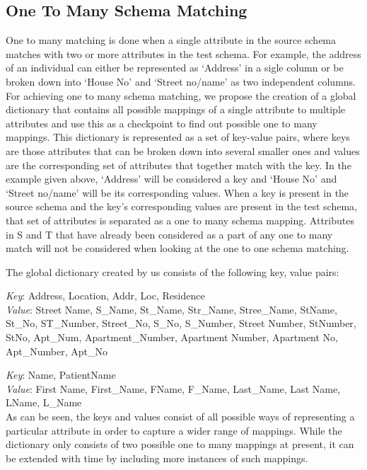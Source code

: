 \documentclass[conference]{IEEEtran}
\begin{document}
\subsection{One To Many Schema Matching}
One to many matching is done when a single attribute in the source schema matches with two or more attributes in the test schema. For example, the address of an individual can either be represented as `Address' in a sigle column or be broken down into `House No' and `Street no/name' as two independent columns. For achieving one to many schema matching, we propose the creation of a global dictionary that contains all possible mappings of a single attribute to multiple attributes and use this as a checkpoint to find out possible one to many mappings. This dictionary is represented as a set of key-value pairs, where keys are those attributes that can be broken down into several smaller ones and values are the corresponding set of attributes that together match with the key. In the example given above, `Address' will be considered a key and `House No' and `Street no/name' will be its corresponding values. When a key is present in the source schema and the key's corresponding values are present in the test schema, that set of attributes is separated as a one to many schema mapping. Attributes in S and T that have already been considered as a part of any one to many match will not be considered when looking at the one to one schema matching. 

The global dictionary created by us consists of the following key, value pairs:

\noindent
\textit{Key}: Address, Location, Addr, Loc, Residence\\
\textit{Value}: Street Name, S\_Name, St\_Name, Str\_Name, Stree\_Name, StName, St\_No, ST\_Number, Street\_No, S\_No, S\_Number, Street Number, StNumber, StNo, Apt\_Num, Apartment\_Number, Apartment Number, Apartment No, Apt\_Number, Apt\_No

\noindent
\textit{Key}: Name, PatientName\\
\textit{Value}: First Name, First\_Name, FName, F\_Name, Last\_Name, Last Name, LName, L\_Name\\

As can be seen, the keys and values consist of all possible ways of representing a particular attribute in order to capture a wider range of mappings. While the dictionary only consists of two possible one to many mappings at present, it can be extended with time by including more instances of such mappings. 
\end{document}
